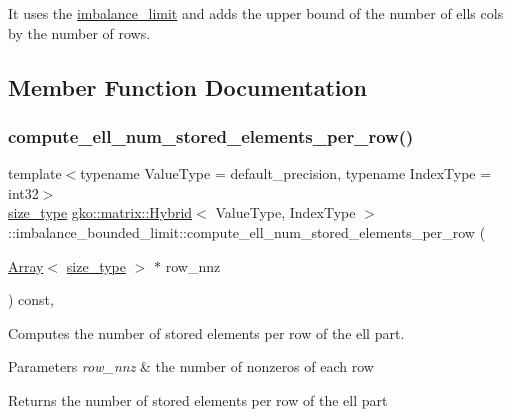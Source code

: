 It uses the \hyperlink{classgko_1_1matrix_1_1Hybrid_1_1imbalance__limit}{imbalance\+\_\+limit} and adds the upper bound of the number of ell\textquotesingle{}s cols by the number of rows. 

\subsection{Member Function Documentation}
\mbox{\label{classgko_1_1matrix_1_1Hybrid_1_1imbalance__bounded__limit_ae68c0d740e1424f5cdb3be5919a856b8}} 
\subsubsection{\texorpdfstring{compute\+\_\+ell\+\_\+num\+\_\+stored\+\_\+elements\+\_\+per\+\_\+row()}{compute\_ell\_num\_stored\_elements\_per\_row()}}
{\footnotesize\ttfamily template$<$typename Value\+Type = default\+\_\+precision, typename Index\+Type = int32$>$ \\
\hyperlink{namespacegko_a6e5c95df0ae4e47aab2f604a22d98ee7}{size\+\_\+type} \hyperlink{classgko_1_1matrix_1_1Hybrid}{gko\+::matrix\+::\+Hybrid}$<$ Value\+Type, Index\+Type $>$\+::imbalance\+\_\+bounded\+\_\+limit\+::compute\+\_\+ell\+\_\+num\+\_\+stored\+\_\+elements\+\_\+per\+\_\+row (\begin{DoxyParamCaption}\item[{\hyperlink{classgko_1_1Array}{Array}$<$ \hyperlink{namespacegko_a6e5c95df0ae4e47aab2f604a22d98ee7}{size\+\_\+type} $>$ $\ast$}]{row\+\_\+nnz }\end{DoxyParamCaption}) const\hspace{0.3cm}{\ttfamily [override]}, {\ttfamily [virtual]}}



Computes the number of stored elements per row of the ell part. 


\begin{DoxyParams}{Parameters}
{\em row\+\_\+nnz} & the number of nonzeros of each row\\
\hline
\end{DoxyParams}
\begin{DoxyReturn}{Returns}
the number of stored elements per row of the ell part 
\end{DoxyReturn}


